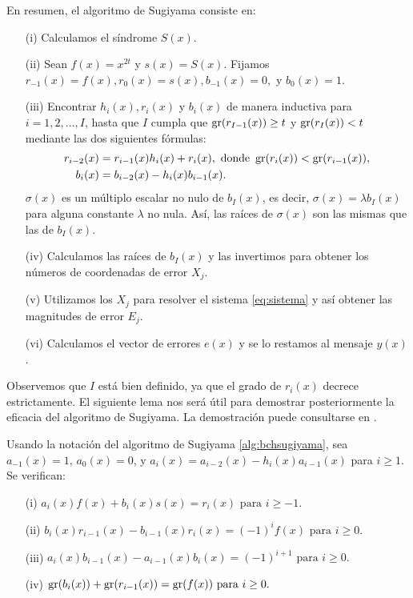 En resumen, el algoritmo de Sugiyama consiste en:

\begin{algoritmo}\label{alg:bchsugiyama}
  \phantom{\\}
  \begin{enumerate}
    \item[(i)] Calculamos el síndrome $S(x)$.
    \item[(ii)] Sean $f(x) = x^{2t}$ y $s(x) = S(x)$. Fijamos $r_{-1}(x) = f(x), r_0(x) = s(x), b_{-1}(x) = 0,$ y $b_0(x) = 1$.
    \item[(iii)] Encontrar $h_i(x),r_i(x)$ y $b_i(x)$ de manera inductiva para $i = 1,2,\dots,I$, hasta que $I$ cumpla que $\operatorname{gr}(r_{I-1}(x)) \geq t$ y $\operatorname{gr}(r_{I}(x)) < t$ mediante las dos siguientes fórmulas: \begin{align*}
      r_{i-2}(x) &= r_{i-1}(x)h_i(x) + r_i(x), \text{       donde } \operatorname{gr}(r_i(x)) < \operatorname{gr}(r_{i-1}(x)), \\
      b_i(x) &= b_{i-2}(x) - h_i(x)b_{i-1}(x).
    \end{align*}
    $\sigma(x)$ es un múltiplo escalar no nulo de $b_I(x)$, es decir, $\sigma(x) = \lambda b_I(x)$ para alguna constante $\lambda$ no nula. Así, las raíces de $\sigma(x)$ son las mismas que las de $b_I(x)$.
    \item[(iv)] Calculamos las raíces de $b_I(x)$ y las invertimos para obtener los números de coordenadas de error $X_j$.
    \item[(v)] Utilizamos los $X_j$ para resolver el sistema \ref{eq:sistema} y así obtener las magnitudes de error $E_j$.
    \item[(vi)] Calculamos el vector de errores $e(x)$ y se lo restamos al mensaje $y(x)$. 
  \end{enumerate}
\end{algoritmo}

Observemos que $I$ está bien definido, ya que el grado de $r_i(x)$ decrece estrictamente. El siguiente lema nos será útil para demostrar posteriormente la eficacia del algoritmo de Sugiyama. La demostración puede consultarse en \cite[p.~191]{Huffman_Pless_2010}.

\begin{lema}\label{lema:as}
Usando la notación del algoritmo de Sugiyama \ref{alg:bchsugiyama}, sea $a_{-1}(x) = 1$, $a_0(x) = 0$, y $a_i(x) = a_{i-2}(x) - h_i(x)a_{i-1}(x)$ para $i \geq 1$. Se verifican:
\begin{itemize}
  \item[(i)] $a_i(x)f(x) + b_i(x)s(x) = r_i(x)  \text{   para } i \geq -1.$
  \item[(ii)] $b_i(x)r_{i-1}(x) - b_{i-1}(x)r_i(x) = (-1)^i f(x) \text{   para } i \geq 0.$
  \item[(iii)] $a_i(x)b_{i-1}(x) - a_{i-1}(x)b_i(x) = (-1)^{i+1}  \text{   para } i \geq 0.$
  \item[(iv)]  $\operatorname{gr}(b_i(x)) +  \operatorname{gr}(r_{i-1}(x)) =  \operatorname{gr}(f(x)) \text{   para } i \geq 0.$
\end{itemize}
\end{lema}

